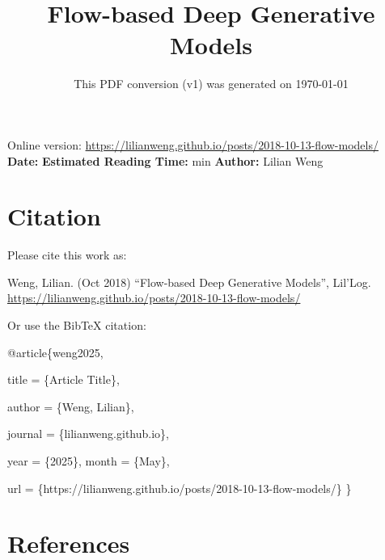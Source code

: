 \documentclass[12pt]{article}
\title{Flow-based Deep Generative Models}
\date{This PDF conversion (v1) was generated on \today\footnotemark}
\begin{document}
\maketitle
\begin{center}
    Online version: \url{https://lilianweng.github.io/posts/2018-10-13-flow-models/} \\
    \textbf{Date:} \quad
    \textbf{Estimated Reading Time:}  min \quad
    \textbf{Author:} Lilian Weng
\end{center}




\newpage
\tableofcontents
\newpage
\vspace{1em}
\n\n\n\section{Citation}
Please cite this work as:

\begin{tcolorbox}[colback=black!5!white, colframe=black!80!white, boxrule=0.5pt, arc=2mm, left=1mm, right=1mm, top=1mm, bottom=1mm]
  Weng, Lilian. (Oct 2018) ``Flow-based Deep Generative Models'', Lil'Log. \url{https://lilianweng.github.io/posts/2018-10-13-flow-models/}
  \end{tcolorbox}

Or use the BibTeX citation:

\begin{tcolorbox}[
    colback=black!5!white,
    colframe=black!80!white,
    boxrule=0.5pt,
    arc=2mm,
    left=1mm,
    right=1mm,
    top=1mm,
    bottom=1mm,
    listing only,
    listing options={
      basicstyle=\ttfamily\footnotesize,
      breaklines=true,
      literate={\{}{{\char`\{}}1 {\}}{{\char`\}}}1
    }
  ]
  @article\{weng2025,

    title   = \{Article Title\},

    author  = \{Weng, Lilian\},

    journal = \{lilianweng.github.io\},

    year    = \{2025\},
    month   = \{May\},

    url     = \{https://lilianweng.github.io/posts/2018-10-13-flow-models/\}\n
  \}
  \end{tcolorbox}

\newpage
\section{References}

\n
\end{document}
